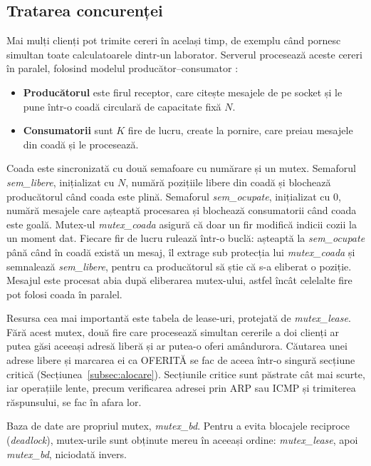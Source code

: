 \documentclass[conference]{IEEEtran}
\begin{document}
\subsection{Tratarea concurenței}\label{subsec:concurenta}
Mai mulți clienți pot trimite cereri în același timp, de exemplu când pornesc simultan toate calculatoarele dintr-un laborator. Serverul procesează aceste cereri în paralel, folosind modelul producător--consumator \cite{tanenbaum}:
\begin{itemize}
\item \textbf{Producătorul} este firul receptor, care citește mesajele de pe socket și le pune într-o coadă circulară de capacitate fixă $N$.
\item \textbf{Consumatorii} sunt $K$ fire de lucru, create la pornire, care preiau mesajele din coadă și le procesează.
\end{itemize}

Coada este sincronizată cu două semafoare cu numărare și un mutex. Semaforul \textit{sem\_libere}, inițializat cu $N$, numără pozițiile libere din coadă și blochează producătorul când coada este plină. Semaforul \textit{sem\_ocupate}, inițializat cu 0, numără mesajele care așteaptă procesarea și blochează consumatorii când coada este goală. Mutex-ul \textit{mutex\_coada} asigură că doar un fir modifică indicii cozii la un moment dat. Fiecare fir de lucru rulează într-o buclă: așteaptă la \textit{sem\_ocupate} până când în coadă există un mesaj, îl extrage sub protecția lui \textit{mutex\_coada} și semnalează \textit{sem\_libere}, pentru ca producătorul să știe că s-a eliberat o poziție. Mesajul este procesat abia după eliberarea mutex-ului, astfel încât celelalte fire pot folosi coada în paralel.


Resursa cea mai importantă este tabela de lease-uri, protejată de \textit{mutex\_lease}. Fără acest mutex, două fire care procesează simultan cererile a doi clienți ar putea găsi aceeași adresă liberă și ar putea-o oferi amândurora. Căutarea unei adrese libere și marcarea ei ca OFERITĂ se fac de aceea într-o singură secțiune critică (Secțiunea~\ref{subsec:alocare}). Secțiunile critice sunt păstrate cât mai scurte, iar operațiile lente, precum verificarea adresei prin ARP sau ICMP și trimiterea răspunsului, se fac în afara lor.

Baza de date are propriul mutex, \textit{mutex\_bd}. Pentru a evita blocajele reciproce (\textit{deadlock}), mutex-urile sunt obținute mereu în aceeași ordine: \textit{mutex\_lease}, apoi \textit{mutex\_bd}, niciodată invers.
\end{document}
